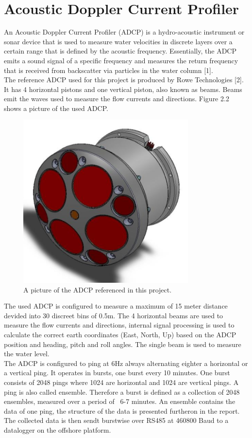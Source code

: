 \section{Acoustic Doppler Current Profiler}
An Acoustic Doppler Current Profiler (ADCP) is a hydro-acoustic instrument or sonar device that is used to measure water velocities in discrete layers over a certain range that is defined by the acoustic frequency. Essentially, the ADCP emits a sound signal of a specific frequency and measures the return frequency that is received from backscatter via particles in the water column [1].\\
The reference ADCP used for this project is produced by Rowe Technologies [2]. It has 4 horizontal pistons and one vertical piston, also known as beams. Beams emit the waves used to measure the flow currents and directions. Figure 2.2 shows a picture of the used ADCP.\\
\begin{figure}[h]
\centering
      \includegraphics[width=0.8\textwidth]{adcp}
        \caption{A picture of the ADCP referenced in this project. }
\end{figure}
The used ADCP is configured to measure a maximum of 15 meter distance devided into 30 discreet bins of 0.5m. The 4 horizontal beams are used to measure the flow currents and directions, internal signal processing is used to calculate the correct earth coordinates (East, North, Up) based on the ADCP position and heading, pitch and roll angles. The single beam is used to measure the water level.\\
The ADCP is configured to ping at 6Hz always alternating eighter a horizontal or a vertical ping. It operates in bursts, one burst every 10 minutes. One burst consists of 2048 pings where 1024 are horizontal and 1024 are vertical pings. A ping is also called ensemble. Therefore a burst is defined as a collection of 2048 ensembles, measured over a period of ~6-7 minutes. An ensemble contains the data of one ping, the structure of the data is presented furtheron in the report. The collected data is then sendt burstwise over RS485 at 460800 Baud to a datalogger on the offshore platform.

